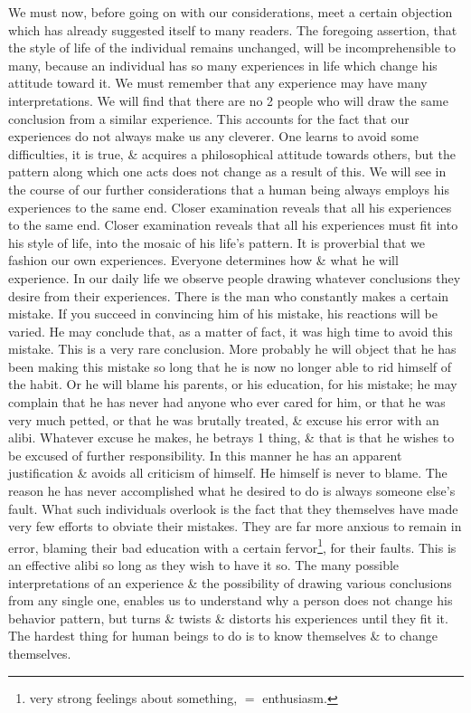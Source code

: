 \documentclass{article}
\begin{document}
We must now, before going on with our considerations, meet a certain objection which has already suggested itself to many readers. The foregoing assertion, that the style of life of the individual remains unchanged, will be incomprehensible to many, because an individual has so many experiences in life which change his attitude toward it. We must remember that any experience may have many interpretations. We will find that there are no 2 people who will draw the same conclusion from a similar experience. This accounts for the fact that our experiences do not always make us any cleverer. One learns to avoid some difficulties, it is true, \& acquires a philosophical attitude towards others, but the pattern along which one acts does not change as a result of this. We will see in the course of our further considerations that a human being always employs his experiences to the same end. Closer examination reveals that all his experiences to the same end. Closer examination reveals that all his experiences must fit into his style of life, into the mosaic of his life's pattern. It is proverbial that we fashion our own experiences. Everyone determines how \& what he will experience. In our daily life we observe people drawing whatever conclusions they desire from their experiences. There is the man who constantly makes a certain mistake. If you succeed in convincing him of his mistake, his reactions will be varied. He may conclude that, as a matter of fact, it was high time to avoid this mistake. This is a very rare conclusion. More probably he will object that he has been making this mistake so long that he is now no longer able to rid himself of the habit. Or he will blame his parents, or his education, for his mistake; he may complain that he has never had anyone who ever cared for him, or that he was very much petted, or that he was brutally treated, \& excuse his error with an alibi. Whatever excuse he makes, he betrays 1 thing, \& that is that he wishes to be excused of further responsibility. In this manner he has an apparent justification \& avoids all criticism of himself. He himself is never to blame. The reason he has never accomplished what he desired to do is always someone else's fault. What such individuals overlook is the fact that they themselves have made very few efforts to obviate their mistakes. They are far more anxious to remain in error, blaming their bad education with a certain fervor\footnote{very strong feelings about something, $=$  enthusiasm.}, for their faults. This is an effective alibi so long as they wish to have it so. The many possible interpretations of an experience \& the possibility of drawing various conclusions from any single one, enables us to understand why a person does not change his behavior pattern, but turns \& twists \& distorts his experiences until they fit it. The hardest thing for human beings to do is to know themselves \& to change themselves.
\end{document}
